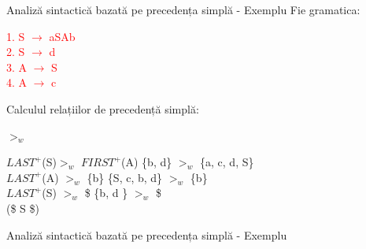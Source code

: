 \documentclass[pdf]{beamer}
\begin{document}
\begin{frame}{Analiză sintactică bazată pe precedența simplă - Exemplu}
Fie gramatica:

\textcolor{red}{1. S $\rightarrow$ aSAb}\\
\textcolor{red}{2. S $\rightarrow$ d}\\
\textcolor{red}{3. A $\rightarrow$ S}\\
\textcolor{red}{4. A $\rightarrow$ c}
\newline

Calculul relațiilor de precedență simplă:

$>_w$
\newline

$LAST^+$(S)$>_{w}$ $FIRST^+$(A) \hspace{2cm} \{b, d\} $>_{w}$ \{a, c, d, S\}\;\\

$LAST^+$(A) $>_{w}$ \{b\}\;     \hspace{3.1cm} \{S, c, b, d\} $>_{w}$ \{b\}\; \\

$LAST^+$(S) $>_{w}$ \$          \hspace{3.6cm} \{b, d \} $>_{w}$ \$ \\

(\$ S \$)
\end{frame}



\begin{frame}{Analiză sintactică bazată pe precedența simplă - Exemplu}
\centering
{}
\end{frame}
\end{document}
